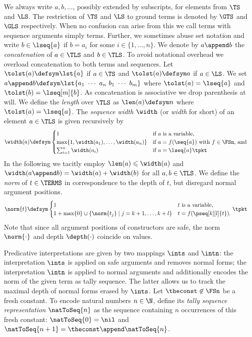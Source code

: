 \documentclass{LMCS}
\begin{document}
We always write $a,b, \dots$, possibly extended by
subscripts, for elements from $\TS$ and $\LS$.  
The restriction of $\TS$ and $\LS$ to ground terms is denoted  
by $\GTS$ and $\GLS$ respectively.
When no confusion can arise from this we call terms with sequence arguments simply terms.
Further, we sometimes abuse set notation and write $b \in \lseq{a}$ if 
$b = a_i$ for some $i \in \{1,\dots,n\}$.
We denote by $a \append b$ the \emph{concatenation} of $a \in \TLS$ and $b \in \TLS$.
To avoid notational overhead we overload concatenation to both terms and sequences.
Let $\tolst(a) \defsym \lst{a}$ if $a \in \TS$ and $\tolst(a) \defsym a$ if $a \in \LS$.
We set $a \append b \defsym \lst{a_1~\cdots~a_n~b_1~\cdots~b_m}$ 
where $\tolst(a) = \lseq{a}$ and $\tolst(b) = \lseq[m]{b}$.
As concatenation is associative we drop parenthesis at will.
We define the \emph{length} over $\TLS$ as $\len(a) \defsym n$ where $\tolst(a) = \lseq{a}$.
The \emph{sequence width} $\width$ (or \emph{width} for short) 
of an element $a \in \TLS$ is given recursively by
\begin{equation*}
  \width(a) \defsym
  \begin{cases}
    1 & \text{if $a$ is a variable, }\\
    \max \{1,\width(a_1),\dots,\width(a_n)\} & \text{if $a = f(\seq{a})$ with $f \in \FSn$, and}\\
    \sum_{i=1}^n \width(a_i)
    & \text{if $a = \lseq{a}$}
    \tpkt
  \end{cases}
\end{equation*}
In the following we tacitly employ $\len(a) \leqslant \width(a)$ and $\width(a \append b) = \width(a) + \width(b)$ for all $a,b \in \TLS$.
We define the \emph{norm} of $t \in \TERMS$ in correspondence to the depth of $t$, but 
disregard normal argument positions.
\begin{equation*}
  \norm{t} \defsym
  \begin{cases}
    1 & \text{$t$ is a variable,} \\
    1+ \max\{0\} \cup \{\norm{t_{j}} \mid j = k+1,\dots,k+l\} & \text{$t=f(\pseq[k][l]{t})$}.
  \end{cases}
  \tpkt
\end{equation*}
Note that since all argument positions of constructors are safe,\label{d:normonval}
the norm $\norm{\cdot}$ and depth $\depth(\cdot)$ coincide on values.

Predicative interpretations are given by two mappings $\ints$ and $\intn$:
the interpretation $\ints$ is applied on safe arguments and removes normal forms; 
the interpretation $\intn$ is applied to normal arguments and additionally encodes
the norm of the given term as tally sequence. The latter allows us to  
track the maximal depth of normal forms erased by $\ints$.
Let $\theconst \not \in \FSn$ be a fresh constant.
To encode natural numbers $n\in \N$, 
define its \emph{tally sequence representation} $\natToSeq{n}$ 
as the sequence containing $n$ occurrences of this fresh constant:
$\natToSeq{0} = \nil$ and $\natToSeq{n+1} = \theconst \append \natToSeq{n}$.
\end{document}
